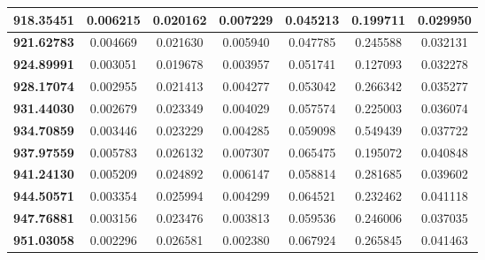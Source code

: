 \documentclass[10pt, a4paper]{article}
\begin{document}
\begin{appendices}
\begin{longtable}{|c|c|c|c|c|c|c|}
	\textbf{918.35451} & 0.006215 & 0.020162 & 0.007229 & 0.045213 & 0.199711 & 0.029950 \\ \hline
	\textbf{921.62783} & 0.004669 & 0.021630 & 0.005940 & 0.047785 & 0.245588 & 0.032131 \\ \hline
	\textbf{924.89991} & 0.003051 & 0.019678 & 0.003957 & 0.051741 & 0.127093 & 0.032278 \\ \hline
	\textbf{928.17074} & 0.002955 & 0.021413 & 0.004277 & 0.053042 & 0.266342 & 0.035277 \\ \hline
	\textbf{931.44030} & 0.002679 & 0.023349 & 0.004029 & 0.057574 & 0.225003 & 0.036074 \\ \hline
	\textbf{934.70859} & 0.003446 & 0.023229 & 0.004285 & 0.059098 & 0.549439 & 0.037722 \\ \hline
	\textbf{937.97559} & 0.005783 & 0.026132 & 0.007307 & 0.065475 & 0.195072 & 0.040848 \\ \hline
	\textbf{941.24130} & 0.005209 & 0.024892 & 0.006147 & 0.058814 & 0.281685 & 0.039602 \\ \hline
	\textbf{944.50571} & 0.003354 & 0.025994 & 0.004299 & 0.064521 & 0.232462 & 0.041118 \\ \hline
	\textbf{947.76881} & 0.003156 & 0.023476 & 0.003813 & 0.059536 & 0.246006 & 0.037035 \\ \hline
	\textbf{951.03058} & 0.002296 & 0.026581 & 0.002380 & 0.067924 & 0.265845 & 0.041463 \\ \hline
\end{longtable}
\pagebreak


\end{appendices}
\end{document}
